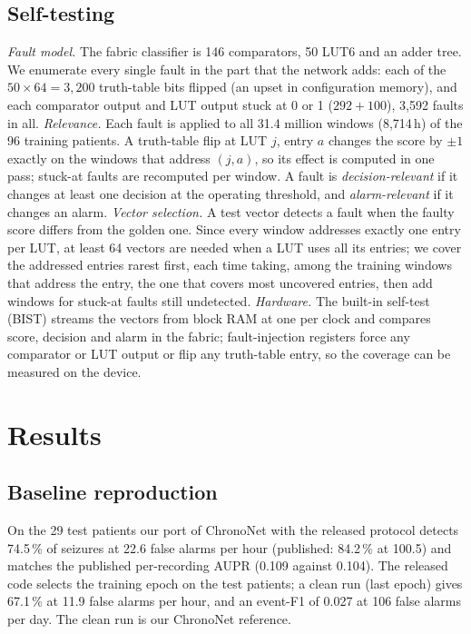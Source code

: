\documentclass[conference]{IEEEtran}
\begin{document}
\subsection{Self-testing}\label{sec:selftest}
\textit{Fault model.} The fabric classifier is 146 comparators, 50 LUT6 and an adder tree. We enumerate every single
fault in the part that the network adds: each of the $50 \times 64 = 3{,}200$ truth-table bits flipped (an upset in
configuration memory), and each comparator output and LUT output stuck at 0 or 1 ($292 + 100$), 3,592 faults in all.
\textit{Relevance.} Each fault is applied to all 31.4 million windows (8,714\,h) of the 96 training patients. A
truth-table flip at LUT $j$, entry $a$ changes the score by $\pm 1$ exactly on the windows that address $(j, a)$, so its
effect is computed in one pass; stuck-at faults are recomputed per window. A fault is \emph{decision-relevant} if it
changes at least one decision at the operating threshold, and \emph{alarm-relevant} if it changes an alarm.
\textit{Vector selection.} A test vector detects a fault when the faulty score differs from the golden one. Since every
window addresses exactly one entry per LUT, at least 64 vectors are needed when a LUT uses all its entries; we cover the
addressed entries rarest first, each time taking, among the training windows that address the entry, the one that
covers most uncovered entries, then add windows for stuck-at faults still undetected. \textit{Hardware.} The built-in
self-test (BIST) streams the vectors from block RAM at one per clock and compares score, decision and alarm in the
fabric; fault-injection registers force any comparator or LUT output or flip any truth-table entry, so the coverage can
be measured on the device.

\section{Results}
\subsection{Baseline reproduction}
On the 29 test patients our port of ChronoNet with the released protocol detects 74.5\,\% of seizures at 22.6 false
alarms per hour (published: 84.2\,\% at 100.5) and matches the published per-recording AUPR (0.109 against 0.104). The
released code selects the training epoch on the test patients; a clean run (last epoch) gives 67.1\,\% at 11.9 false
alarms per hour, and an event-F1 of 0.027 at 106 false alarms per day. The clean run is our ChronoNet reference.
\end{document}
